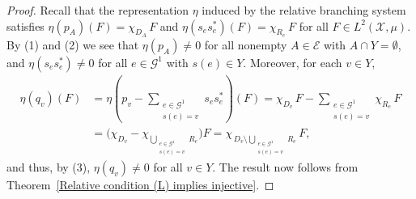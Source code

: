 \documentclass[12pt, reqno]{amsart}
\newtheorem{theorem}{Theorem}[section]
\theoremstyle{definition}
\theoremstyle{remark}
\newtheorem{remark}[theorem]{Remark}
\numberwithin{equation}{section}
\newcommand{\G}{\mathcal{G}}
\begin{document}
\begin{proof}
Recall that the representation $\eta$ induced by the relative branching system satisfies
$\eta(p_A)(F) = \chi_{D_A}\,F$ and $\eta(s_e s_e^*)(F) = \chi_{R_e}\,F$
for all $F \in L^2(\mathcal{X},\mu)$. By (1) and (2) we see that
$\eta(p_A) \neq 0$ for all nonempty $A \in \mathcal{E}$ with $A \cap Y = \emptyset$, and
$\eta(s_e s_e^*) \neq 0$ for all $e \in \mathcal{G}^1$ with $s(e) \in Y$.
Moreover, for each $v \in Y$,
\begin{align*}
\eta(q_v)(F)
&= \eta\!\left(p_v - \sum_{\substack{e \in \mathcal{G}^1\\ s(e)=v}} s_e s_e^*\right)(F)
  = \chi_{D_v}\,F - \sum_{\substack{e \in \mathcal{G}^1\\ s(e)=v}} \chi_{R_e}\,F \\
&= \biggl(\chi_{D_v} - \chi_{\displaystyle\bigcup_{\substack{e \in \mathcal{G}^1\\ s(e)=v}} R_e}\biggr) F
  = \chi_{\,D_v \setminus \displaystyle\bigcup_{\substack{e \in \mathcal{G}^1\\ s(e)=v}} R_e}\,F,
\end{align*}
and thus, by (3), $\eta(q_v) \neq 0$ for all $v \in Y$. The result now follows from
Theorem~\ref{Relative condition (L) implies injective}.
\end{proof}





\end{document}
